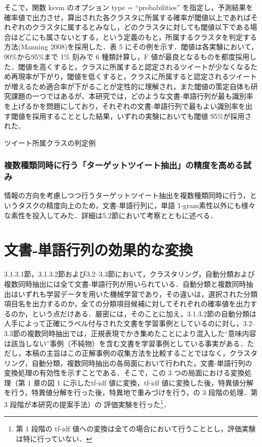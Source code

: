 \documentclass[japanese]{jnlp_1.4}
\begin{document}
そこで，関数 ksvm のオプション type = ``probabilities'' を指定し，予測結果を確率値で出力させ，算出された各クラスタに所属する確率が閾値以上であればそれぞれのクラスタに属するとみなし，どのクラスタに対しても閾値以下である場合はどこにも属さないとする，という定義のもと，所属するクラスタを判定する方法(Manning 2008)を採用した．表 5 にその例を示す．閾値は各実験において，90\%から95\%まで 1\% 刻みで 6 種類計算し，F 値が最良となるものを都度採用した．閾値を高くすると，クラスに所属すると認定されるツイートが少なくなるため再現率が下がり，閾値を低くすると，クラスに所属すると認定されるツイートが増えるため適合率が下がることが定性的に理解され，また閾値の策定自体も研究課題の一つではあるが、本研究では，どのような文書‐単語行列が最も識別率を上げるかを問題にしており，それぞれの文書‐単語行列で最もよい識別率を出す閾値を採用することとした結果，いずれの実験においても閾値 95\%が採用された．

\begin{table}[t]
\caption{ツイート所属クラスの判定例}

\end{table}


\subsubsection{複数種類同時に行う「ターゲットツイート抽出」の精度を高める試み}

情報の方向を考慮しつつ行うターゲットツイート抽出を複数種類同時に行う，というタスクの精度向上のため，文書‐単語行列に，単語 1-gram素性以外にも様々な素性を投入してみた．詳細は5.2節において考察とともに述べる．



\section{文書‐単語行列の効果的な変換}

3.1.3.1節，3.1.3.2節および3.2--3.3節において，クラスタリング，自動分類および複数同時抽出には全て文書‐単語行列が用いられている．自動分類と複数同時抽出はいずれも学習データを用いた機械学習であり，その違いは，選択された分類項目名を出力するのか，全ての分類項目候補に対してそれぞれの確率値を出力するのか，という点だけある．厳密には，そのことに加え，3.1.3.2節の自動分類は人手によって正確にラベル付与された文書を学習事例としているのに対し，3.2--3.3節の複数同時抽出では，正規表現でかき集めたことにより混入した``意味内容は該当しない''事例（不純物）を含む文書を学習事例としている事実がある．ただし，本稿の主旨はこの正解事例の収集方法を比較することではなく，クラスタリング，自動分類，複数同時抽出の各局面において行われた，文書‐単語行列の変換処理の有効性を示すことである．そこで，この 3 つの局面における変換処理（第 1 章の図 1 に示したtf-idf 値に変換，tf-idf 値に変換した後，特異値分解を行う，特異値分解を行った後，特異地で重みづけを行う，の 3 段階の処理．第 3 段階が本研究の提案手法）の
評価実験を行った\footnote{第 1 段階の tf-idf 値への変換は全ての場合において行うこととし，評価実験は特に行っていない．}．
\end{document}
